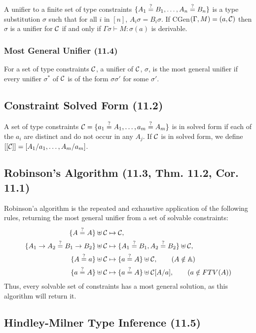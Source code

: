 A unifier to a finite set of type constraints
$\{A_1 \teq B_1, \ldots, A_n \teq B_n\}$ is a type substitution $\sigma$
such that for all $i$ in $[n]$, $A_i\sigma = B_i\sigma$.
If CGen$(\Gamma, M) = (a, \mathcal{C})$ then 
$\sigma$ is a unifier for $\mathcal{C}$ if and only if 
$\Gamma\sigma \vdash M : \sigma(a)$ is derivable.

\subsubsection{Most General Unifier (11.4)}

For a set of type constraints $\mathcal{C}$, a unifier of $\mathcal{C}$, $\sigma$, 
is the most general unifier if every unifier $\sigma^*$ of $\mathcal{C}$ is 
of the form $\sigma\sigma'$ for some $\sigma'$.

\subsection{Constraint Solved Form (11.2)}

A set of type constraints $\mc{C} = \{a_1 \teq A_1, \ldots, a_m \teq A_m\}$
is in solved form if each of the $a_i$ are distinct and do not occur
in any $A_j$. If $\mathcal{C}$ is in solved form, we define 
$[[\mathcal{C}]] = [A_1/a_1, \ldots, A_m/a_m]$.

\subsection{Robinson's Algorithm (11.3, Thm. 11.2, Cor. 11.1)}

Robinson'a algorithm is the repeated and exhaustive application of the 
following rules, returning the most general unifier from
a set of solvable constraints: \begin{align*}
    \{A \teq A\} \uplus \mc{C} 
    &\mapsto \mc{C}, 
    \\
    \{A_1 \to A_2 \teq B_1 \to B_2\} \uplus \mc{C} 
    &\mapsto \{A_1 \teq B_1, A_2 \teq B_2\} \uplus \mc{C}, 
    \\
    \{A \teq a\} \uplus \mc{C} 
    &\mapsto \{a \teq A\} \uplus \mc{C}, \tag{$A \notin \mb{A}$} 
    \\
    \{a \teq A\} \uplus \mc{C} 
    &\mapsto \{a \teq A\} \uplus \mc{C}[A / a], \tag{$a \notin FTV(A)$} 
\end{align*} Thus, every solvable set of constraints has a most general solution,
as this algorithm will return it.

\subsection{Hindley-Milner Type Inference (11.5)}

